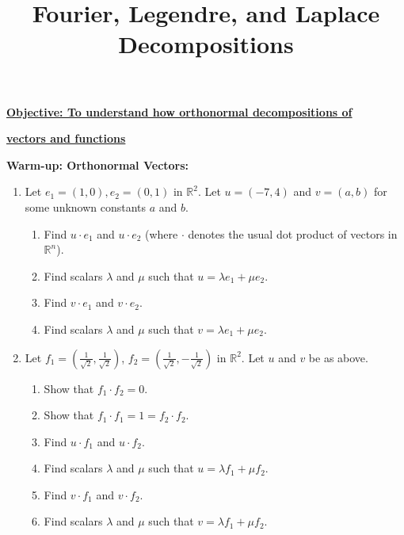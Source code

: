 \documentclass{article}
\begin{document}
\title{Fourier, Legendre, and Laplace Decompositions}
\date{}

\maketitle
\thispagestyle{empty}

\Large

\textbf{\underline{Objective: To understand how orthonormal decompositions of}}

\textbf{\underline{vectors and functions}}






\vspace{5mm}



\textbf{Warm-up: Orthonormal Vectors:}\bigskip



\begin{enumerate}
	\item Let $e_1=(1,0), e_2=(0,1)$ in $\mathbb{R}^2$. Let $u=(-7,4)$ and $v=(a,b)$ for some unknown constants $a$ and $b$.
		\begin{enumerate}
			\item Find $u\cdot e_1$ and $u\cdot e_2$ (where $\cdot$ denotes the usual dot product of vectors in $\mathbb{R}^n$).
			\item Find scalars $\lambda$ and $\mu$ such that $u=\lambda e_1+\mu e_2$.
			\item Find $v\cdot e_1$ and $v\cdot e_2$.
			\item Find scalars $\lambda$ and $\mu$ such that $v=\lambda e_1 + \mu e_2$.
		\end{enumerate}
	\item Let $f_1=\left(\frac{1}{\sqrt{2}},\frac{1}{\sqrt{2}}\right)$, $f_2=\left(\frac{1}{\sqrt{2}},-\frac{1}{\sqrt{2}}\right)$ in $\mathbb{R}^2$. Let $u$ and $v$ be as above.
		\begin{enumerate}
			\item Show that $f_1\cdot f_2=0$.
			\item Show that $f_1\cdot f_1=1=f_2\cdot f_2$.
			\item Find $u\cdot f_1$ and $u\cdot f_2$.
			\item Find scalars $\lambda$ and $\mu$ such that $u=\lambda f_1+\mu f_2$.
			\item Find $v\cdot f_1$ and $v\cdot f_2$.
			\item Find scalars $\lambda$ and $\mu$ such that $v=\lambda f_1 + \mu f_2$.
		\end{enumerate}
\end{enumerate}
\end{document}
